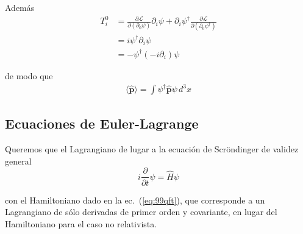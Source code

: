 \begin{frame}
Además
\begin{align}
    T^0_i&=\frac{\partial\mathcal{L}}{\partial\left(\partial_0\psi\right)}\partial_i\psi+\partial_i\psi^\dagger\frac{\partial\mathcal{L}}{\partial\left(\partial_0\psi^\dagger\right)}\nonumber\\
    &=i\psi^\dagger\partial_i\psi\nonumber\\
    &=-\psi^\dagger(-i\partial_i)\psi
\end{align}

de modo que
\begin{align}
\langle\hat{\boldsymbol{p}}\rangle=\int\psi^\dagger\hat{\boldsymbol{p}}\psi\,d^3 x
\end{align}
\end{frame}

\subsection{Ecuaciones de Euler-Lagrange}
\label{sec:ecuaciones-de-euler}

\begin{frame}
Queremos que el Lagrangiano de lugar a la ecuación de Scröndinger de validez general
\begin{equation}
  \label{eq:grlsch}
  i\frac{\partial}{\partial t}\psi=\hat{H} \psi
\end{equation}
\end{frame}
con el Hamiltoniano dado en la ec.~(\ref{eq:99qft}), que corresponde a un Lagrangiano de sólo derivadas de primer orden y covariante, en lugar del Hamiltoniano para el caso no relativista. 

